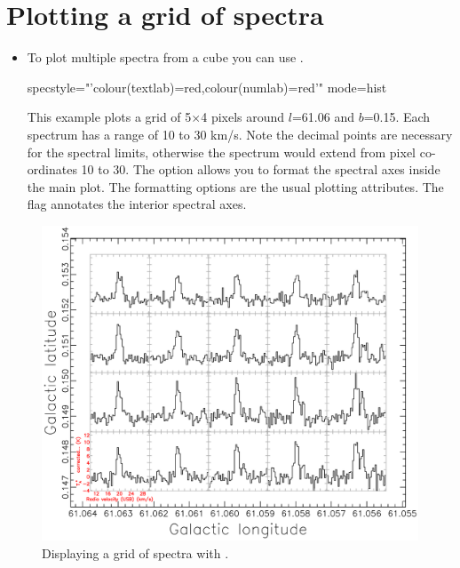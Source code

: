\documentclass[11pt,oneside,chapters]{starlink}
\newcommand{\udeg}{\hspace{-0.3em}\dgs\hspace{-0.08em}}
\newcommand{\udeg}{\HCode{&deg}}
\begin{document}
\section{Plotting a grid of spectra}
\begin{itemize}
\item To plot multiple spectra from a cube you can use \clinplot.

\begin{terminalv}
  specstyle="'colour(textlab)=red,colour(numlab)=red'" mode=hist
\end{terminalv}

This example plots a grid of 5$\times$4 pixels around $l$=61.\udeg06
and $b$=0.\udeg15. Each spectrum has a range of 10 to 30 km/s.  Note
the decimal points are necessary for the spectral limits, otherwise
the spectrum would extend from pixel co-ordinates 10 to 30.  The
 option allows you to format the spectral axes inside
the main plot. The formatting options are the usual plotting
attributes.  The flag  annotates the interior spectral
axes.

\end{itemize}

\begin{figure}[h!]
\begin{center}
\includegraphics[width=0.9\linewidth]{sc20_clinplot}
\caption[Displaying a grid of spectra with \clinplot.]{\label{fig:display6}
  Displaying a grid of spectra with \clinplot.}
\end{center}
\end{figure}
\end{document}
